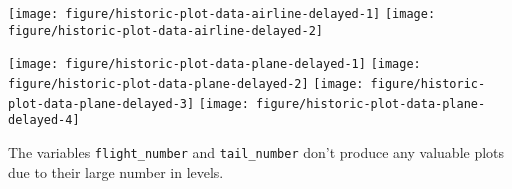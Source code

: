 \documentclass{article}\usepackage[]{graphicx}\usepackage[]{color}
\newenvironment{knitrout}{}{} %
\begin{document}
\begin{knitrout}
\color{fgcolor}

{\centering \texttt{[image: figure/historic-plot-data-airline-delayed-1]} 
\texttt{[image: figure/historic-plot-data-airline-delayed-2]} 

}



\end{knitrout}

\begin{knitrout}
\color{fgcolor}

{\centering \texttt{[image: figure/historic-plot-data-plane-delayed-1]} 
\texttt{[image: figure/historic-plot-data-plane-delayed-2]} 
\texttt{[image: figure/historic-plot-data-plane-delayed-3]} 
\texttt{[image: figure/historic-plot-data-plane-delayed-4]} 

}



\end{knitrout}

The variables \verb+flight_number+ and \verb+tail_number+ don't produce any valuable plots due to their large number in levels.
\end{document}
